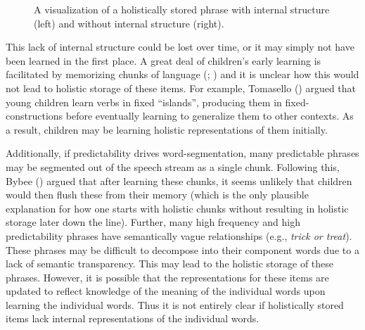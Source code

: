 \documentclass[
  12pt,
  letterpaper,
]{scrreprt}
\begin{document}
\begin{figure}[htbp]

\caption{\label{fig-nointernalstructure}A visualization of a
holistically stored phrase with internal structure (left) and without
internal structure (right).}


\end{figure}%

This lack of internal structure could be lost over time, or it may
simply not have been learned in the first place. A great deal of
children's early learning is facilitated by memorizing chunks of
language (;
) and it is unclear how this would not lead to holistic storage of
these items. For example, Tomasello
()
argued that young children learn verbs in fixed ``islands'', producing
them in fixed-constructions before eventually learning to generalize
them to other contexts. As a result, children may be learning holistic
representations of them initially.

Additionally, if predictability drives word-segmentation, many
predictable phrases may be segmented out of the speech stream as a
single chunk. Following this, Bybee ()
argued that after learning these chunks, it seems unlikely that children
would then flush these from their memory (which is the only plausible
explanation for how one starts with holistic chunks without resulting in
holistic storage later down the line). Further, many high frequency and
high predictability phrases have semantically vague relationships (e.g.,
\emph{trick or treat}). These phrases may be difficult to decompose into
their component words due to a lack of semantic transparency. This may
lead to the holistic storage of these phrases. However, it is possible
that the representations for these items are updated to reflect
knowledge of the meaning of the individual words upon learning the
individual words. Thus it is not entirely clear if holistically stored
items lack internal representations of the individual words.
\end{document}
